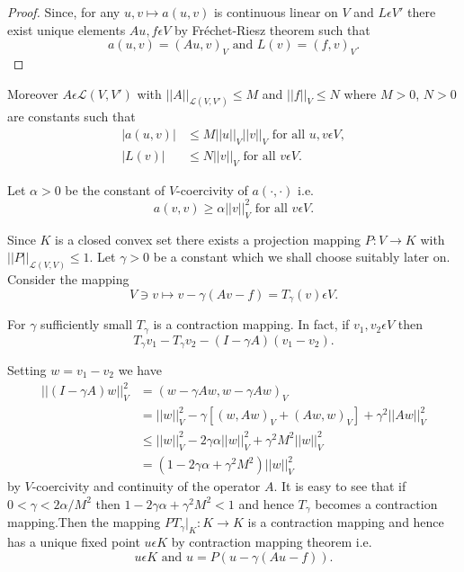\begin{proof}
Since, for any $u, v \mapsto a(u, v)$ is continuous linear on $V$ and $L \epsilon V'$ there exist unique elements $Au, f \epsilon V$ by Fr\'{e}chet-Riesz theorem such that
$$
a(u, v) = (Au, v)_{V} \text{ and } L(v) = (f, v)_{V}.
$$\pageoriginale
\end{proof}

Moreover $A \epsilon \mathscr{L} (V, V')$ with $||A||_{\mathscr{L}(V, V')} \leq M$ and $||f||_{V} \leq N$ where $M > 0$, $N > 0$ are constants such that
\begin{align*}
|a(u, v)| & \leq M||u||_{V} ||v||_{V} \text{ for all } u, v \epsilon V,\\
|L(v)| & \leq N||v||_{V} \text{ for all } v \epsilon V.
\end{align*}

Let $\alpha > 0$ be the constant of $V$-coercivity of $a(\cdot , \cdot)$ i.e. 
$$
a(v, v) \geq \alpha||v||_{V}^{2} \text{ for all } v \epsilon V.
$$

Since $K$ is a closed convex set there exists a projection mapping $P : V \to K$ with $||P||_{\mathscr{L}(V, V)} \leq 1$. Let $\gamma > 0$ be a constant which we shall choose suitably later on. Consider the mapping
$$
V \ni v \mapsto v - \gamma (Av-f) = T_{\gamma}(v) \epsilon V.
$$

For $\gamma$ sufficiently small $T_{\gamma}$ is a contraction mapping. In fact, if $v_{1}, v_{2} \epsilon V$ then
$$
T_{\gamma} v_{1} - T_{\gamma} v_{2} - (I - \gamma A) (v_{1} - v_{2}).
$$

Setting $w = v_{1} - v_{2}$ we have
\begin{align*}
||(I -\gamma A)w||_{V}^{2} & = (w - \gamma A w, w - \gamma A w)_{V}\\
& = ||w||_{V}^{2} - \gamma [(w, Aw)_{V} + (A w, w)_{V}] + \gamma^{2} ||Aw||_{V}^{2}\\
& \leq ||w||_{V}^{2} - 2\gamma \alpha ||w||_{V}^{2} + \gamma^{2} M^{2} ||w||_{V}^{2}\\
& = (1 - 2\gamma \alpha + \gamma^{2} M^{2}) ||w||_{V}^{2}
\end{align*}
by $V$-coercivity and continuity of the operator $A$. It is easy to see that if $0 < \gamma < 2\alpha/M^{2}$ then $1 - 2\gamma \alpha + \gamma^{2} M^{2} < 1$ and hence $T_{\gamma}$ becomes a contraction mapping.\pageoriginale Then the mapping $PT_{\gamma}|_{K} : K \to K$ is a contraction mapping and hence has a unique fixed point $u \epsilon K$ by contraction mapping theorem i.e. 
$$
u \epsilon K \text{ and } u = P(u - \gamma(Au - f)).
$$

